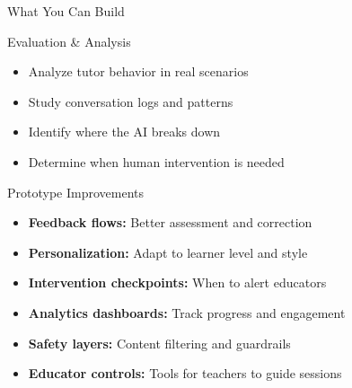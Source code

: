 \documentclass[aspectratio=169]{beamer}
\begin{document}
\begin{frame}{What You Can Build}
\begin{block}{Evaluation \& Analysis}
\begin{itemize}
    \item Analyze tutor behavior in real scenarios
    \item Study conversation logs and patterns
    \item Identify where the AI breaks down
    \item Determine when human intervention is needed
\end{itemize}
\end{block}

\vspace{0.3cm}

\begin{block}{Prototype Improvements}
\begin{itemize}
    \item \textbf{Feedback flows:} Better assessment and correction
    \item \textbf{Personalization:} Adapt to learner level and style
    \item \textbf{Intervention checkpoints:} When to alert educators
    \item \textbf{Analytics dashboards:} Track progress and engagement
    \item \textbf{Safety layers:} Content filtering and guardrails
    \item \textbf{Educator controls:} Tools for teachers to guide sessions
\end{itemize}
\end{block}
\end{frame}
\end{document}
